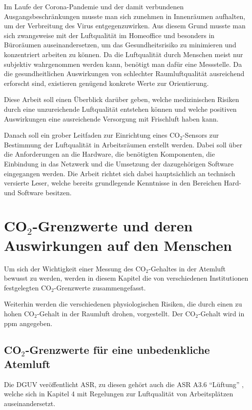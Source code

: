 \documentclass[a4paper,
    12pt,
    headings=small,
    ngerman,
    listof=totoc,
    numbers=noenddot]{scrreprt}[2021/11/13]
\begin{document}
Im Laufe der Corona-Pandemie und der damit verbundenen Ausgangsbeschränkungen musste man sich zunehmen in Innenräumen aufhalten, um der Verbreitung des Virus entgegenzuwirken. Aus diesem Grund musste man sich zwangsweise mit der Luftqualität im Homeoffice und besonders in Büroräumen auseinandersetzen, um das Gesundheitsrisiko zu minimieren und konzentriert arbeiten zu können. Da die Luftqualität durch Menschen meist nur subjektiv wahrgenommen werden kann, benötigt man dafür eine Messstelle. Da die gesundheitlichen Auswirkungen von schlechter Raumluftqualität ausreichend erforscht sind, existieren genügend konkrete Werte zur Orientierung.

Diese Arbeit soll einen Überblick darüber geben, welche medizinischen Risiken durch eine unzureichende Luftqualität entstehen können und welche positiven Auswirkungen eine ausreichende Versorgung mit Frischluft haben kann.

Danach soll ein grober Leitfaden zur Einrichtung eines CO$_2$-Sensors zur Bestimmung der Luftqualität in Arbeitsräumen erstellt werden. Dabei soll über die Anforderungen an die Hardware, die benötigten Komponenten, die Einbindung in das Netzwerk und die Umsetzung der dazugehörigen Software eingegangen werden. Die Arbeit richtet sich dabei hauptsächlich an technisch versierte Leser, welche bereits grundlegende Kenntnisse in den Bereichen Hard- und Software besitzen.


\chapter{CO\texorpdfstring{$_2$}{TEXT}-Grenzwerte und deren Auswirkungen auf den Menschen}\label{chapter:2}

Um sich der Wichtigkeit einer Messung des CO$_2$-Gehaltes in der Atemluft bewusst zu werden, werden in diesem Kapitel die von verschiedenen Institutionen festgelegten CO$_2$-Grenzwerte zusammengefasst.

Weiterhin werden die verschiedenen physiologischen Risiken, die durch einen zu hohen CO$_2$-Gehalt in der Raumluft drohen, vorgestellt. Der CO$_2$-Gehalt wird in \ac{ppm} angegeben.


\section{CO\texorpdfstring{$_2$}{TEXT}-Grenzwerte für eine unbedenkliche Atemluft}

Die \ac{DGUV} veröffentlicht \ac{ASR}, zu diesen gehört auch die \ac{ASR} A3.6 \enquote{Lüftung} \autocite{ASR}, welche sich in Kapitel 4 mit Regelungen zur Luftqualität von Arbeitsplätzen auseinandersetzt.
\end{document}
